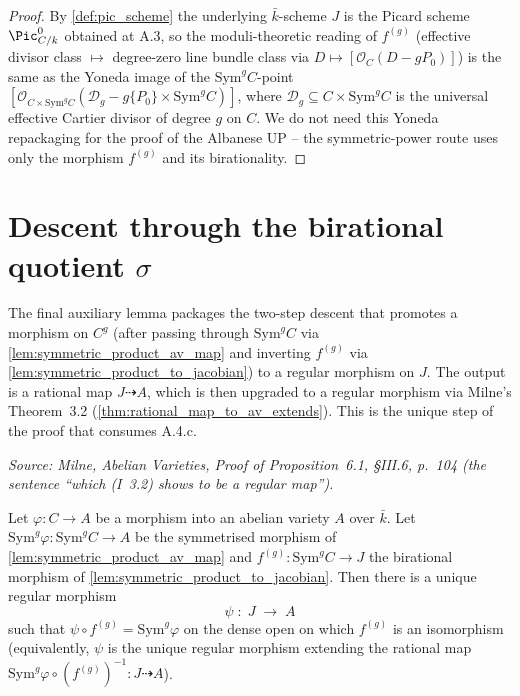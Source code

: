 \begin{proof}
  By \cref{def:pic_scheme} the underlying \(\bar k\)-scheme \(J\) is the
  Picard scheme \(\Pic^0_{C/k}\) obtained at A.3, so the moduli-theoretic
  reading of \(f^{(g)}\) (effective divisor class \(\mapsto\) degree-zero
  line bundle class via \(D \mapsto [\mathcal O_C(D - g P_0)]\)) is the
  same as the Yoneda image of the \(\mathrm{Sym}^g C\)-point
  \([\mathcal O_{C \times \mathrm{Sym}^g C}(\mathcal D_g - g\{P_0\} \times
  \mathrm{Sym}^g C)]\), where \(\mathcal D_g \subseteq C \times \mathrm{Sym}^g
  C\) is the universal effective Cartier divisor of degree \(g\) on \(C\). We
  do not need this Yoneda repackaging for the proof of the Albanese UP --
  the symmetric-power route uses only the morphism \(f^{(g)}\) and its
  birationality.
\end{proof}

\section{Descent through the birational quotient \(\sigma\)}
\label{sec:albaneseup_descent}

The final auxiliary lemma packages the two-step descent that promotes a
morphism on \(C^g\) (after passing through \(\mathrm{Sym}^g C\) via
\cref{lem:symmetric_product_av_map} and inverting \(f^{(g)}\) via
\cref{lem:symmetric_product_to_jacobian}) to a regular morphism on
\(J\). The output is a rational map \(J \dashrightarrow A\), which is then
upgraded to a regular morphism via Milne's Theorem~3.2
(\cref{thm:rational_map_to_av_extends}). This is the unique step of the
proof that consumes A.4.c.

\begin{lemma}
  \label{lem:descent_through_birational_sigma}

  \textit{Source: Milne, \emph{Abelian Varieties}, Proof of Proposition~6.1,
  \S III.6, p.~104 (the sentence ``which (I~3.2) shows to be a regular
  map'').}

  Let \(\varphi \colon C \to A\) be a morphism into an abelian variety \(A\)
  over \(\bar k\). Let \(\mathrm{Sym}^g \varphi \colon \mathrm{Sym}^g C \to A\)
  be the symmetrised morphism of \cref{lem:symmetric_product_av_map} and
  \(f^{(g)} \colon \mathrm{Sym}^g C \to J\) the birational morphism of
  \cref{lem:symmetric_product_to_jacobian}. Then there is a unique
  regular morphism
  \[
    \psi \;\colon\; J \;\longrightarrow\; A
  \]
  such that \(\psi \circ f^{(g)} = \mathrm{Sym}^g \varphi\) on the dense open
  on which \(f^{(g)}\) is an isomorphism (equivalently, \(\psi\) is the unique
  regular morphism extending the rational map
  \(\mathrm{Sym}^g \varphi \circ (f^{(g)})^{-1} \colon J \dashrightarrow
  A\)).
\end{lemma}

